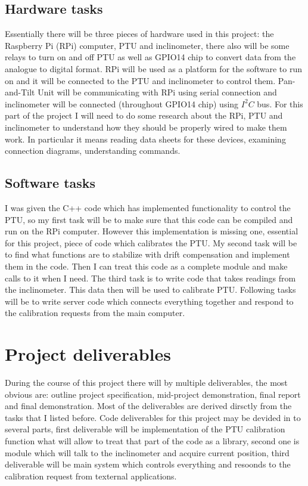 \documentclass[11pt,fleqn,twoside]{article}
\begin{document}
\subsection{Hardware tasks}
Essentially there will be three pieces of hardware used in this project: the Raspberry Pi (RPi) computer, PTU and inclinometer, there also will be some relays to turn on and off PTU as well as GPIO14 chip to convert data from the analogue to digital format. RPi will be used as a platform for the software to run on and it will be connected to the PTU and inclinometer to control them. Pan-and-Tilt Unit will be communicating with RPi using serial connection and inclinometer will be connected (throughout GPIO14 chip) using \begin{math}I^2 C\end{math} bus. For this part of the project I will need to do some research about the RPi, PTU and inclinometer to understand how they should be properly wired to make them work. In particular it means reading data sheets for these devices, examining connection diagrams, understanding commands.

\subsection{Software tasks}
I was given the C++ code which has implemented functionality to control the PTU, so my first task will be to make sure that this code can be compiled and run on the RPi computer. However this implementation is missing one, essential for this project, piece of code which calibrates the PTU. My second task will be to find what functions are to stabilize with drift compensation and implement them in the code. Then I can treat this code as a complete module and make calls to it when I need. The third task is to write code that takes readings from the inclinometer. This data then will be used to calibrate PTU. Following tasks will be to write server code which connects everything together and respond to the calibration requests from the main computer.

\section{Project deliverables}
During the course of this project there will by multiple deliverables, the most obvious are: outline project specification, mid-project demonstration, final report and final demonstration. Most of the deliverables are derived dirsctly from the tasks that  I listed before. Code deliverables for this project may be devided in to several parts, first deliverable will be implementation of the PTU calibration function what will allow to treat that part of the code as a library, second one is module which will talk to the inclinometer and acquire current position, third deliverable will be  main system which controls everything and resoonds to the calibration request from texternal applications.
\end{document}
